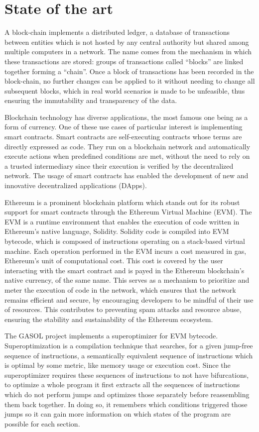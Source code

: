 \chapter{State of the art}
\label{cap:state-of-the-art}

A block-chain implements a distributed ledger, a database of transactions
between entities which is not hosted by any central authority but shared
among multiple computers in a network. The name comes from the mechanism
in which these transactions are stored: groups of transactions called
``blocks'' are linked together forming a ``chain''. Once a block of 
transactions has been recorded in the block-chain, no further changes can
be applied to it without needing to change all subsequent blocks, which in
real world scenarios is made to be unfeasible, thus ensuring the immutability
and transparency of the data.

Blockchain technology has diverse applications, the most famous one being
as a form of currency. One of these use cases of particular interest is 
implementing smart contracts. Smart contracts are self-executing contracts
whose terms are directly expressed as code. They run on a blockchain 
network and automatically execute actions when predefined conditions are
met, without the need to rely on a trusted intermediary since their
execution is verified by the decentralized network. The usage of smart
contracts has enabled the development of new and innovative decentralized
applications (DApps).

Ethereum is a prominent blockchain platform which stands out for its robust
support for smart contracts through the Ethereum Virtual Machine (EVM). The
EVM is a runtime environment that enables the execution of code written in
Ethereum's native language, Solidity. Solidity code is compiled into EVM 
bytecode, which is composed of instructions operating on a stack-based 
virtual machine. Each operation performed in the EVM incurs a cost measured 
in gas, Ethereum's unit of computational cost. This cost is covered by the 
user interacting with the smart contract and is payed in the Ethereum 
blockchain's native currency, of the same name. This serves as a mechanism 
to prioritize and meter the execution of code in the network, which ensures 
that the network remains efficient and secure, by encouraging developers to 
be mindful of their use of resources. This contributes to preventing spam 
attacks and resource abuse, ensuring the stability and sustainability of the 
Ethereum ecosystem.

The GASOL project implements a superoptimizer for EVM bytecode. Superoptimization 
is a compilation technique that searches, for a given jump-free sequence of 
instructions, a semantically equivalent sequence of instructions which is optimal
by some metric, like memory usage or execution cost. Since the superoptimizer 
requires these sequences of instructions to not have bifurcations, to optimize a
whole program it first extracts all the sequences of instructions which do not perform
jumps and optimizes those separately before reassembling them back together. 
In doing so, it remembers which conditions triggered those jumps so it can gain more
information on which states of the program are possible for each section.

